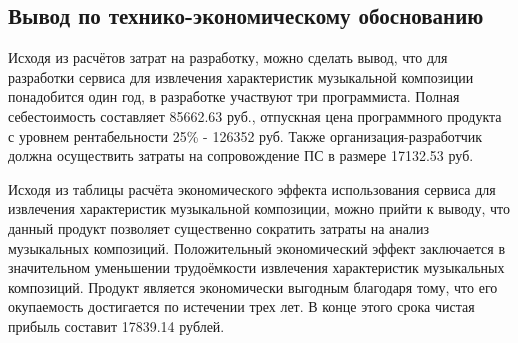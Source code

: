 \subsection{Вывод по технико-экономическому обоснованию}
\label{sec:economics:conclusion}
Исходя из расчётов затрат на разработку, можно сделать вывод, что для разработки сервиса для извлечения характеристик музыкальной композиции понадобится один год, в разработке участвуют три программиста. Полная себестоимость составляет 85662.63 руб., отпускная цена программного продукта с уровнем рентабельности 25\% - 126352 руб. Также организация-разработчик должна осуществить затраты на сопровождение ПС в размере 17132.53 руб.

Исходя из таблицы расчёта экономического эффекта использования сервиса для извлечения характеристик музыкальной композиции, можно прийти к выводу, что данный продукт позволяет существенно сократить затраты на анализ музыкальных композиций. Положительный экономический эффект заключается в значительном уменьшении трудоёмкости извлечения характеристик музыкальных композиций. Продукт является экономически выгодным благодаря тому, что его окупаемость достигается по истечении трех лет. В конце этого срока чистая прибыль составит 17839.14 рублей.
